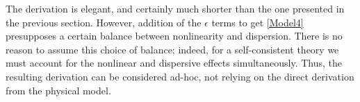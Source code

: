 The derivation is elegant, and certainly much shorter than the one presented in the previous section. However, addition of the $\epsilon$ terms to get \eqref{Model4} 
presupposes a certain balance between nonlinearity and dispersion. There is no reason to assume this choice of balance; indeed, for a self-consistent theory we must account for the nonlinear and dispersive effects simultaneously. Thus, the resulting derivation can be considered ad-hoc, not relying on the direct derivation from the physical model.

